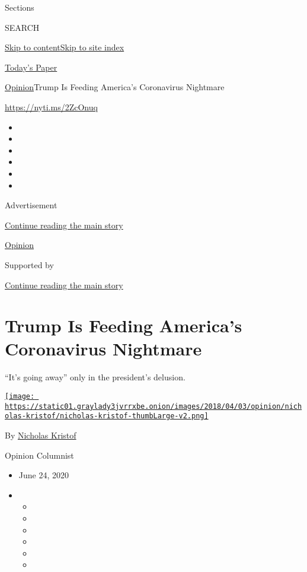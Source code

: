 Sections

SEARCH

\protect\hyperlink{site-content}{Skip to
content}\protect\hyperlink{site-index}{Skip to site index}

\href{https://myaccount.nytimes3xbfgragh.onion/auth/login?response_type=cookie\&client_id=vi}{}

\href{https://www.nytimes3xbfgragh.onion/section/todayspaper}{Today's
Paper}

\href{/section/opinion}{Opinion}\textbar{}Trump Is Feeding America's
Coronavirus Nightmare

\url{https://nyti.ms/2ZcOnuq}

\begin{itemize}
\item
\item
\item
\item
\item
\item
\end{itemize}

Advertisement

\protect\hyperlink{after-top}{Continue reading the main story}

\href{/section/opinion}{Opinion}

Supported by

\protect\hyperlink{after-sponsor}{Continue reading the main story}

\hypertarget{trump-is-feeding-americas-coronavirus-nightmare}{%
\section{Trump Is Feeding America's Coronavirus
Nightmare}\label{trump-is-feeding-americas-coronavirus-nightmare}}

``It's going away'' only in the president's delusion.

\href{https://www.nytimes3xbfgragh.onion/column/nicholas-kristof}{\texttt{[image: https://static01.graylady3jvrrxbe.onion/images/2018/04/03/opinion/nicholas-kristof/nicholas-kristof-thumbLarge-v2.png]}}

By
\href{https://www.nytimes3xbfgragh.onion/column/nicholas-kristof}{Nicholas
Kristof}

Opinion Columnist

\begin{itemize}
\item
  June 24, 2020
\item
  \begin{itemize}
  \item
  \item
  \item
  \item
  \item
  \item
  \end{itemize}
\end{itemize}

